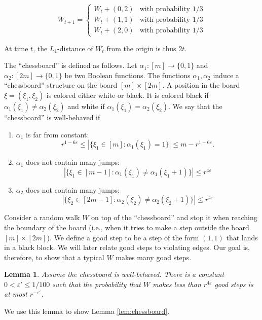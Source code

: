\documentclass[10pt,a4paper]{article}
\newtheorem{lem}[theorem]{Lemma}
\theoremstyle{definition}%
\theoremstyle{plain}
\newcommand{\eps}{\varepsilon}
\begin{document}
\[
W_{t+1} = \begin{cases}
     W_t + (0,2) &\text{with probability $1/3$}\\
     W_t + (1,1) &\text{with probability $1/3$}\\
     W_t + (2,0) &\text{with probability $1/3$}
\end{cases}
\]

At time $t$, the $L_1$-distance of $W_t$ from the origin is thus $2t$.

The “chessboard” is defined as follows. Let $\alpha_1 : [m] \rightarrow \{0, 1\}$ and $\alpha_2 : [2m] \rightarrow \{0, 1\}$ be two
Boolean functions. The functions $\alpha_1, \alpha_2$ induce a “chessboard” structure on the board $[m] \times [2m]$.
A position in the board $\xi = (\xi_1, \xi_2)$ is colored either white or black. It is colored black if $\alpha_1(\xi_1) \neq
\alpha_2(\xi_2)$ and white if $\alpha_1(\xi_1) = \alpha_2(\xi_2)$. We say that the “chessboard” is well-behaved if

\begin{enumerate}
    \item $\alpha_1$ is far from constant:
    \[
r^{1-6\eps} \leq
|\{\xi_1 \in [m] : \alpha_1(\xi_1) = 1\}|  \leq m - r^{1-6\eps}.
    \]
    \item $\alpha_1$ does not contain many jumps:
    \[
|\{\xi_1 \in [m - 1] : \alpha_1(\xi_1) \neq \alpha_1(\xi_1 + 1)\}|\leq r^{4\eps}
    \]
    \item $\alpha_2$ does not contain many jumps:
   \[
|\{\xi_2 \in [2m - 1] : \alpha_2(\xi_2) \neq \alpha_2(\xi_2 + 1)\}|\leq r^{4\eps}
    \]
\end{enumerate}

Consider a random walk $W$ on top of the “chessboard” and stop it when reaching the boundary
of the board (i.e., when it tries to make a step outside the board $[m] \times [2m]$). We define a good
step to be a step of the form $(1, 1)$ that lands in a black block. We will later relate good steps to
violating edges. Our goal is, therefore, to show that a typical $W$ makes many good steps.

\begin{lem}\label{lem:good-steps}
    Assume the chessboard is well-behaved. There is a constant $0<\eps'\leq 1/100$ such that the probability that $W$ makes less than $r^{4\eps}$
good steps is at most $r^{-\eps'}$.
\end{lem}

We use this lemma to show Lemma \ref{lem:chessboard}.
\end{document}
